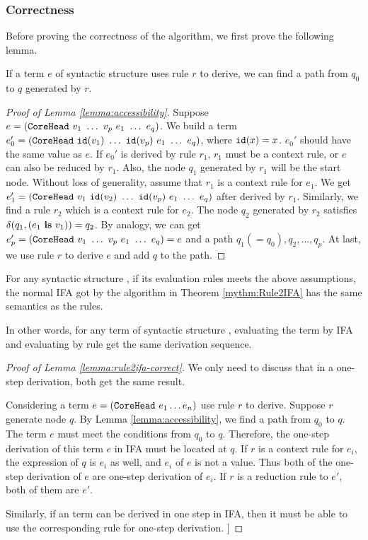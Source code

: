 \subsubsection{Correctness}

Before proving the correctness of the algorithm, we first prove the following lemma.

\begin{lemma}
\label{lemma:accessibility}
If a term $e$ of syntactic structure  uses rule $r$ to derive, we can find a path from $q_0$ to $q$ generated by $r$.
\end{lemma}

\begin{proof}[Proof of Lemma \ref{lemma:accessibility}]
Suppose $e=(\mbox{\tt CoreHead}~v_1~\ldots~v_p~e_1~\ldots~e_q)$. We build a term $e_0'=(\mbox{\tt CoreHead}~\mbox{\tt id}(v_1)~\ldots~\mbox{\tt id}(v_p)~e_1~\ldots~e_q)$, where $\mbox{\tt id}(x)=x$. $e_0'$ should have the same value as $e$. If $e_0'$ is derived by rule $r_1$, $r_1$ must be a context rule, or $e$ can also be reduced by $r_1$. Also, the node $q_1$ generated by $r_1$ will be the start node. Without loss of generality, assume that $r_1$ is a context rule for $e_1$. We get $e_1'=(\mbox{\tt CoreHead}~v_1~\mbox{\tt id}(v_2)~\ldots~\mbox{\tt id}(v_p)~e_1~\ldots~e_q)$ after derived by $r_1$. Similarly, we find a rule $r_2$ which is a context rule for $e_2$. The node $q_2$ generated by $r_2$ satisfies $\delta(q_1, (e_1~\mbox{\rm \bf is}~v_1))=q_2$. By analogy, we can get $e_p'=(\mbox{\tt CoreHead}~v_1~\ldots~v_p~e_1~\ldots~e_q)=e$ and a path $q_1(=q_0), q_2, \ldots, q_p$. At last, we use rule $r$ to derive $e$ and add $q$ to the path.
\end{proof}

\begin{lemma}
\label{lemma:rule2ifa-correct}
For any syntactic structure , if its evaluation rules meets the above assumptions, the normal IFA got by the algorithm in Theorem \ref{mythm:Rule2IFA} has the same semantics as the rules. 
\end{lemma}

In other words, for any term of syntactic structure , evaluating the term by IFA and evaluating by rule get the same derivation sequence.

\begin{proof}[Proof of Lemma \ref{lemma:rule2ifa-correct}]
We only need to discuss that in a one-step derivation, both get the same result.

Considering a term $e=(\mbox{\tt CoreHead}~e_1 \ldots e_n)$ use rule $r$ to derive. Suppose $r$ generate node $q$. By Lemma \ref{lemma:accessibility}, we find a path from $q_0$ to $q$. The term $e$ must meet the conditions from $q_0$ to $q$. Therefore, the one-step derivation of this term $e$ in IFA must be located at $q$. If $r$ is a context rule for $e_i$, the expression of $q$ is $e_i$ as well, and $e_i$ of $e$ is not a value. Thus both of the one-step derivation of $e$ are one-step derivation of $e_i$. If $r$ is a reduction rule to $e'$, both of them are $e'$.

Similarly, if an term can be derived in one step in IFA, then it must be able to use the corresponding rule for one-step derivation.
]
\end{proof}

